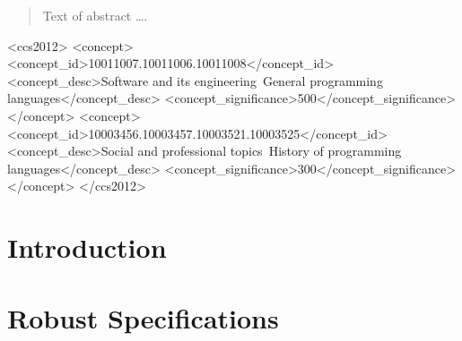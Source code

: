 \documentclass[acmsmall,review,anonymous]{acmart}\settopmatter{printfolios=true,printccs=false,printacmref=false}
\begin{document}
\begin{abstract}
Text of abstract \ldots.
\end{abstract}


\begin{CCSXML}
<ccs2012>
<concept>
<concept_id>10011007.10011006.10011008</concept_id>
<concept_desc>Software and its engineering~General programming languages</concept_desc>
<concept_significance>500</concept_significance>
</concept>
<concept>
<concept_id>10003456.10003457.10003521.10003525</concept_id>
<concept_desc>Social and professional topics~History of programming languages</concept_desc>
<concept_significance>300</concept_significance>
</concept>
</ccs2012>
\end{CCSXML}





\maketitle


\section{Introduction}

\section{Robust Specifications}
\end{document}
